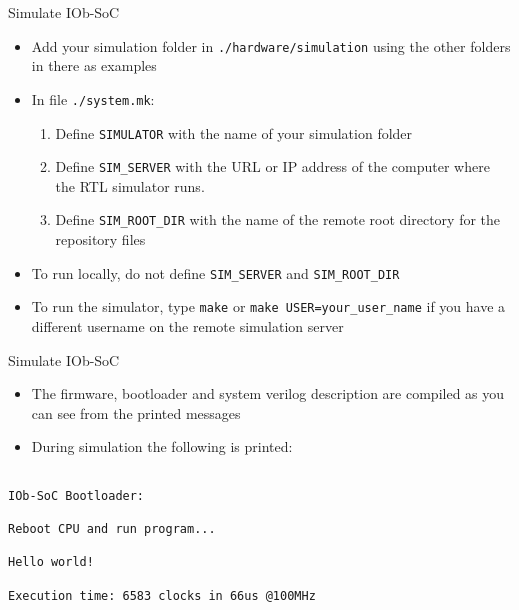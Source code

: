 \documentclass [xcolor=svgnames, t] {beamer}
\begin{document}
\begin{frame}[fragile]{Simulate IOb-SoC}
\begin{itemize}
  \item Add your simulation folder in {\tt ./hardware/simulation} using the other folders in there as examples
  \item In  file {\tt ./system.mk}:
  \begin{enumerate}
    \item Define {\tt SIMULATOR} with the name of your simulation folder
    \item Define {\tt SIM\_SERVER} with the URL or IP address of the computer where the RTL simulator runs.
    \item Define {\tt SIM\_ROOT\_DIR} with the name of the remote root directory for the repository files
  \end{enumerate}
  \item To run locally, do not define {\tt SIM\_SERVER} and {\tt SIM\_ROOT\_DIR}
  \item To run the simulator, type {\tt make} or {\tt make USER=your\_user\_name} if you have a different username on the remote simulation server
\end{itemize}
\end{frame}


\begin{frame}[fragile]{Simulate IOb-SoC}
\begin{itemize}
  \item The firmware, bootloader and system verilog description are compiled as you can see from the printed messages
  \item During simulation the following is printed:
\end{itemize}
\begin{tiny}
\begin{lstlisting}

IOb-SoC Bootloader:

Reboot CPU and run program...

Hello world!

Execution time: 6583 clocks in 66us @100MHz

\end{lstlisting}
\end{tiny}
\end{frame}
\end{document}
